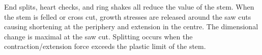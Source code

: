 End splits, heart checks, and ring shakes all reduce the value of the stem. When the stem is felled or cross cut, growth stresses are released
around the saw cuts causing shortening at the periphery and extension in the
centre. The dimensional change is maximal at the saw cut. Splitting occurs when the contraction/extension force exceeds the plastic
limit of the stem.